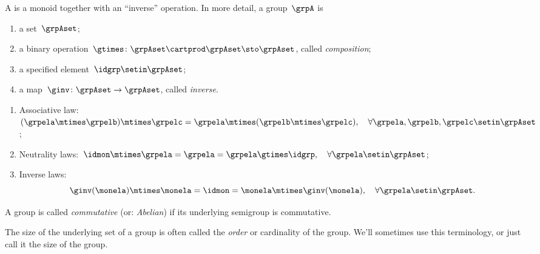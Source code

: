 \begin{ctdefinition}[Group]
    \label{def:group}
    A \emph{} is a monoid together with an ``inverse'' operation.
    In more detail, a group~$\grpA$ is
    \begin{body}
        \constit
        \begin{enumerate}
            \item a set~$\grpAset$;
            \item a binary operation~$\gtimes \colon \grpAset \cartprod \grpAset \sto \grpAset$, called \emph{composition};
            \item a specified element~$\idgrp \setin \grpAset$;
            \item a map~$\ginv\colon \grpAset \to \grpAset$, called \emph{inverse}.
        \end{enumerate}
        \condit
        \begin{enumerate}
            \item Associative law:~$(\grpela\mtimes \grpelb)\mtimes \grpelc=\grpela\mtimes (\grpelb\mtimes \grpelc), \quad \forall  \grpela, \grpelb, \grpelc \setin \grpAset$;
            \item Neutrality laws:~$\idmon\mtimes \grpela=\grpela=\grpela \gtimes \idgrp, \quad \forall  \grpela \setin \grpAset$;
            \item Inverse laws:
                  \begin{equation}
                      \label{eq:group-inverse-law}
                      \ginv(\monela) \mtimes \monela = \idmon = \monela \mtimes \ginv(\monela), \quad \forall  \grpela  \setin \grpAset.
                  \end{equation}
        \end{enumerate}
    \end{body}
\end{ctdefinition}

\begin{ctdefinition}
    A group is called \emph{commutative} (or: \emph{Abelian}) if its underlying semigroup is commutative.
\end{ctdefinition}

\begin{remark}
    The size of the underlying set of a group is often called the \emph{order} or cardinality of the group.
    We'll sometimes use this terminology, or just call it the size of the group.
\end{remark}


